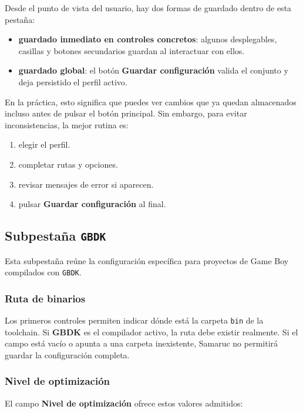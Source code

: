 \documentclass[../../main.tex]{subfiles}
\begin{document}
Desde el punto de vista del usuario, hay dos formas de guardado dentro de esta pestaña:

\begin{itemize}
    \item \textbf{guardado inmediato en controles concretos}: algunos desplegables, casillas y botones secundarios guardan al interactuar con ellos.
    \item \textbf{guardado global}: el botón \textbf{Guardar configuración} valida el conjunto y deja persistido el perfil activo.
\end{itemize}

En la práctica, esto significa que puedes ver cambios que ya quedan almacenados incluso antes de pulsar el botón principal. Sin embargo, para evitar inconsistencias, la mejor rutina es:

\begin{enumerate}
    \item elegir el perfil.
    \item completar rutas y opciones.
    \item revisar mensajes de error si aparecen.
    \item pulsar \textbf{Guardar configuración} al final.
\end{enumerate}

\subsection{Subpestaña \texttt{GBDK}}

Esta subpestaña reúne la configuración específica para proyectos de Game Boy compilados con \texttt{GBDK}.

\subsubsection{Ruta de binarios}

Los primeros controles permiten indicar dónde está la carpeta \texttt{bin} de la toolchain. Si \textbf{GBDK} es el compilador activo, la ruta debe existir realmente. Si el campo está vacío o apunta a una carpeta inexistente, Samaruc no permitirá guardar la configuración completa.

\subsubsection{Nivel de optimización}

El campo \textbf{Nivel de optimización} ofrece estos valores admitidos:
\end{document}
